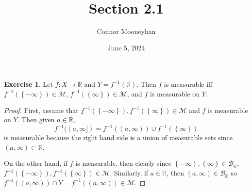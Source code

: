 \documentclass{article}
\title{Section 2.1}
\author{Connor Mooneyhan}
\date{June 5, 2024}
\theoremstyle{definition}
\newtheorem{ex}{Exercise}
\begin{document}
\maketitle

\begin{ex}
	Let $f : X \to \overline{\mathbb{R}}$ and $Y = f^{-1}(\mathbb{R})$.
	Then $f$ is measurable iff $f^{-1}(\left\lbrace -\infty \right\rbrace) \in \mathscr{M}$, $f^{-1}(\left\lbrace \infty \right\rbrace) \in \mathscr{M}$, and $f$ is measurable on $Y$.
\end{ex}
\begin{proof}
	First, assume that $f^{-1}(\left\lbrace -\infty \right\rbrace), f^{-1}(\left\lbrace \infty \right\rbrace) \in \mathscr{M}$ and $f$ is measurable on $Y$.
	Then given $a \in \mathbb{R}$, \begin{equation*}
		f^{-1}((a, \infty]) = f^{-1}((a, \infty)) \cup f^{-1}(\left\lbrace \infty \right\rbrace)
	\end{equation*}
	is measurable because the right hand side is a union of measurable sets since $(a, \infty) \subset \mathbb{R}$.

	On the other hand, if $f$ is measurable, then clearly since $\left\lbrace -\infty \right\rbrace, \left\lbrace \infty \right\rbrace \in \mathscr{B}_{\overline{\mathbb{R}}}$, $f^{-1}(\left\lbrace -\infty \right\rbrace), f^{-1}(\left\lbrace \infty \right\rbrace) \in \mathscr{M}$.
	Similarly, if $a \in \mathbb{R}$, then $(a, \infty) \in \mathscr{B}_{\overline{\mathbb{R}}}$ so $f^{-1}((a, \infty)) \cap Y = f^{-1}((a, \infty)) \in \mathscr{M}$.
\end{proof}
\end{document}
